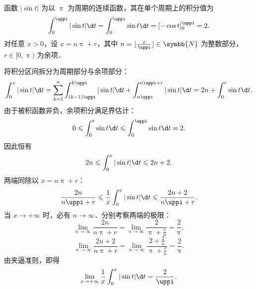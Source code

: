 \begin{myproof}
    函数 $|\sin t|$ 为以 $\uppi$ 为周期的连续函数，其在单个周期上的积分值为
    \begin{equation}
        \int_0^{\uppi} |\sin t| \d t = \int_0^{\uppi} \sin t \d t = [-\cos t]_0^{\uppi} = 2.
    \end{equation}
    对任意 $x > 0$，设 $x = n\uppi + r$，其中 $n = \lfloor \frac{x}{\uppi} \rfloor \in \symbb{N}$ 为整数部分，$r \in [0, \uppi)$ 为余项．

    将积分区间拆分为周期部分与余项部分：
    \begin{equation}
        \int_0^x |\sin t| \d t = \sum_{k=1}^n \int_{(k-1)\uppi}^{k\uppi} |\sin t| \d t + \int_{n\uppi}^{n\uppi + r} |\sin t| \d t = 2n + \int_0^r \sin t \d t.
    \end{equation}
    由于被积函数非负，余项积分满足界估计：
    \begin{equation}
        0 \leqslant \int_0^r \sin t \d t \leqslant \int_0^{\uppi} \sin t \d t = 2.
    \end{equation}
    因此恒有
    \begin{equation}
        2n \leqslant \int_0^x |\sin t| \d t \leqslant 2n + 2.
    \end{equation}
    两端同除以 $x = n\uppi + r$：
    \begin{equation}
        \frac{2n}{n\uppi + r} \leqslant \frac{1}{x}\int_0^x |\sin t| \d t \leqslant \frac{2n + 2}{n\uppi + r}.
    \end{equation}
    当 $x \to +\infty$ 时，必有 $n \to \infty$．分别考察两端的极限：
    \begin{equation}
        \lim_{n\to \infty} \frac{2n}{n\uppi + r} = \lim_{n\to \infty} \frac{2}{\uppi + \frac{r}{n}} = \frac{2}{\uppi},
    \end{equation}
    \begin{equation}
        \lim_{n\to \infty} \frac{2n + 2}{n\uppi + r} = \lim_{n\to \infty} \frac{2 + \frac{2}{n}}{\uppi + \frac{r}{n}} = \frac{2}{\uppi}.
    \end{equation}
    由夹逼准则，即得
    \begin{equation}
        \lim_{x\to +\infty} \frac{1}{x}\int_0^x |\sin t| \d t = \frac{2}{\uppi}.
    \end{equation}
\end{myproof}

